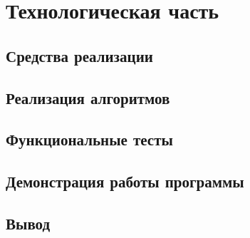 \section{Технологическая часть}

\subsection{Средства реализации}





\subsection{Реализация алгоритмов}


\subsection{Функциональные тесты}


\subsection{Демонстрация работы программы}


\subsection*{Вывод}

